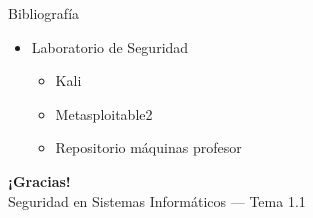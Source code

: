 \documentclass[aspectratio=169,11pt]{beamer}
\begin{document}
\begin{frame}[allowframebreaks]{Bibliografía}
\small
\begin{itemize}
  \item Laboratorio de Seguridad
  \begin{itemize}
    \item Kali
    \item Metasploitable2
    \item Repositorio máquinas profesor
  \end{itemize}
\end{itemize}
\end{frame}

\begin{frame}[plain]
  \begin{center}
    {\Huge\bfseries\color{uznavy} ¡Gracias!}\\[1em]
    {\large Seguridad en Sistemas Informáticos --- Tema 1.1}
  \end{center}
\end{frame}

\end{document}
